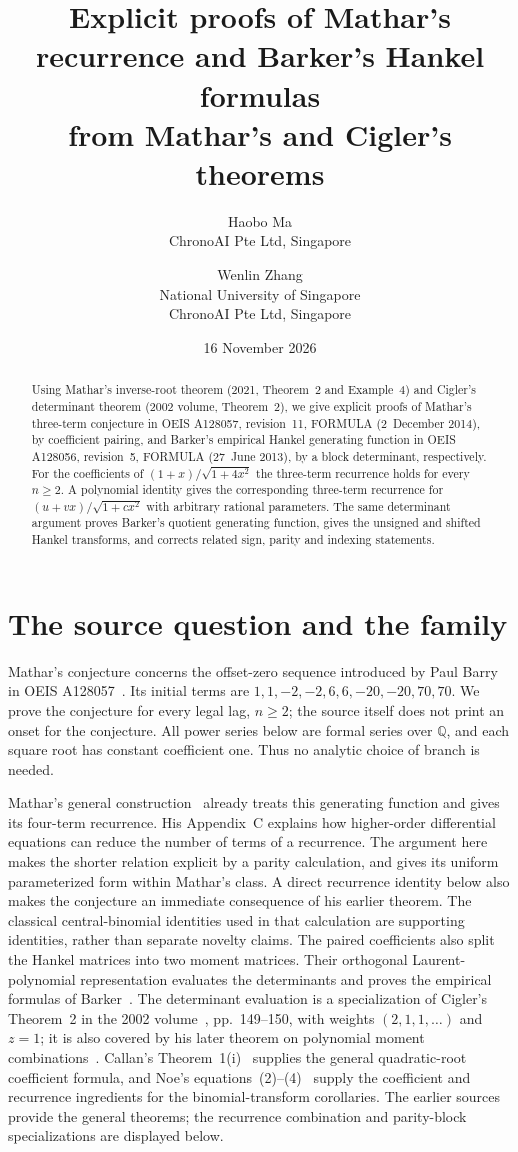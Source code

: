 \documentclass[11pt]{article}
\title{Explicit proofs of Mathar's recurrence and Barker's Hankel formulas\\from Mathar's and Cigler's theorems}
\author{Haobo Ma\\\small ChronoAI Pte Ltd, Singapore
\and Wenlin Zhang\\\small National University of Singapore\\\small ChronoAI Pte Ltd, Singapore}
\date{16 November 2026}
\newcommand{\Q}{\mathbb{Q}}
\begin{document}
\maketitle
\begin{abstract}
Using Mathar's inverse-root theorem (2021, Theorem~2 and Example~4) and
Cigler's determinant theorem (2002 volume, Theorem~2), we give explicit
proofs of Mathar's three-term conjecture in OEIS A128057, revision~11, FORMULA
(2~December 2014), by coefficient pairing, and Barker's empirical Hankel
generating function in OEIS A128056, revision~5, FORMULA (27~June 2013),
by a block determinant, respectively.
For the coefficients of $(1+x)/\sqrt{1+4x^2}$ the three-term recurrence
holds for every $n\geq2$.
A polynomial identity gives the corresponding three-term recurrence for
$(u+vx)/\sqrt{1+cx^2}$ with arbitrary rational parameters.
The same determinant argument proves Barker's quotient generating function,
gives the unsigned and shifted Hankel transforms, and corrects related
sign, parity and indexing statements.
\end{abstract}

\section{The source question and the family}
Mathar's conjecture concerns the offset-zero sequence introduced by Paul
Barry in OEIS A128057~\cite{a128057}. Its initial terms are
$1,1,-2,-2,6,6,-20,-20,70,70$.
We prove the conjecture for every legal lag, $n\geq2$; the source itself
does not print an onset for the conjecture.
All power series below are formal series over $\Q$, and each square root
has constant coefficient one. Thus no analytic choice of branch is needed.

Mathar's general construction~\cite[Theorem~2 and Example~4]{mathar}
already treats this generating function and gives its four-term recurrence.
His Appendix~C explains how higher-order differential equations can reduce
the number of terms of a recurrence. The argument here makes the shorter
relation explicit by a parity calculation, and gives its uniform parameterized
form within Mathar's class. A direct recurrence identity below also makes
the conjecture an immediate consequence of his earlier theorem.
The classical central-binomial identities used in that calculation are
supporting identities, rather than separate novelty claims.
The paired coefficients also split the Hankel matrices into two moment
matrices. Their orthogonal Laurent-polynomial representation evaluates the
determinants and proves the empirical formulas of Barker~\cite{a128056,a128053}.
The determinant evaluation is a specialization of Cigler's Theorem~2
in the 2002 volume~\cite{cigler2002}, pp.~149--150, with weights
$(2,1,1,\ldots)$ and $z=1$; it is also covered by his later theorem
on polynomial moment combinations~\cite[Theorem~2, equations~(43)--(44)]{cigler2012}.
Callan's Theorem~1(i)~\cite{callan} supplies the general quadratic-root
coefficient formula, and Noe's equations~(2)--(4)~\cite{noe} supply the
coefficient and recurrence ingredients for the binomial-transform corollaries.
The earlier sources provide the general theorems; the recurrence combination
and parity-block specializations are displayed below.
\end{document}
